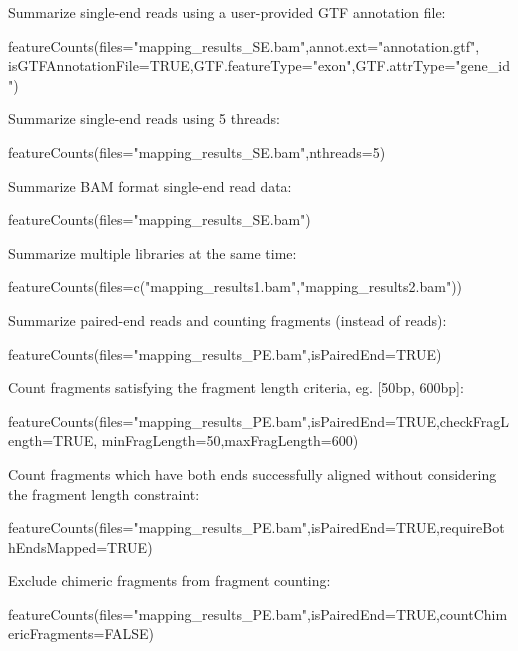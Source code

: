 \documentclass[12pt]{report}
\begin{document}
\noindent Summarize single-end reads using a user-provided GTF annotation file:

\begin{Rcode}
featureCounts(files="mapping_results_SE.bam",annot.ext="annotation.gtf",
isGTFAnnotationFile=TRUE,GTF.featureType="exon",GTF.attrType="gene_id")
\end{Rcode}

\noindent Summarize single-end reads using 5 threads:

\begin{Rcode}
featureCounts(files="mapping_results_SE.bam",nthreads=5)
\end{Rcode}

\noindent Summarize BAM format single-end read data:

\begin{Rcode}
featureCounts(files="mapping_results_SE.bam")
\end{Rcode}

\noindent Summarize multiple libraries at the same time:

\begin{Rcode}
featureCounts(files=c("mapping_results1.bam","mapping_results2.bam"))
\end{Rcode}

\noindent Summarize paired-end reads and counting fragments (instead of reads):

\begin{Rcode}
featureCounts(files="mapping_results_PE.bam",isPairedEnd=TRUE)
\end{Rcode}

\noindent Count fragments satisfying the fragment length criteria, eg. [50bp, 600bp]:

\begin{Rcode}
featureCounts(files="mapping_results_PE.bam",isPairedEnd=TRUE,checkFragLength=TRUE,
minFragLength=50,maxFragLength=600)
\end{Rcode}

\noindent Count fragments which have both ends successfully aligned without considering the fragment length constraint:

\begin{Rcode}
featureCounts(files="mapping_results_PE.bam",isPairedEnd=TRUE,requireBothEndsMapped=TRUE)
\end{Rcode}

\noindent Exclude chimeric fragments from fragment counting:

\begin{Rcode}
featureCounts(files="mapping_results_PE.bam",isPairedEnd=TRUE,countChimericFragments=FALSE)
\end{Rcode}
\end{document}
